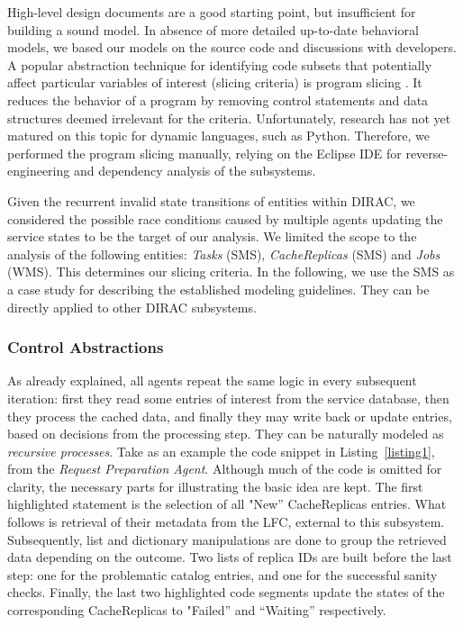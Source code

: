\documentclass[10pt,conference]{IEEEtran}
\begin{document}
High-level design documents are a good starting point, but insufficient for 
building a sound model.
In absence of more detailed up-to-date behavioral models, 
we based our models on the source code and discussions with developers.
A popular abstraction technique
for identifying code subsets that potentially affect particular 
variables of interest (slicing criteria) is program slicing \cite{Hatcliff99slicingsoftware}. 
It reduces the behavior of a program
by removing control statements and data structures deemed irrelevant for 
the criteria. Unfortunately, research has not yet
matured on this topic for dynamic languages, such as Python. 
Therefore, we performed the program slicing manually, relying on the Eclipse IDE for 
reverse-engineering and dependency analysis of the subsystems.

Given the recurrent invalid state transitions of entities within DIRAC, 
we considered the possible race conditions caused by multiple agents updating 
the service states to be the target of our analysis. We limited the scope
to the analysis of the following entities: \textit{Tasks} (SMS), \textit{CacheReplicas} (SMS) and \textit{Jobs} (WMS).
This determines our slicing criteria. In the following, we use the SMS as a case study
for describing the established modeling guidelines. They can be 
directly applied to other DIRAC subsystems.

\subsubsection{Control Abstractions}
As already explained, all agents repeat the same logic in every subsequent iteration: first they
read some entries of interest from the service database, then they process the cached data, and finally
they may write back or update entries, based on decisions from the processing step.
They can be naturally modeled as \textit{recursive processes}.
Take as an example the code snippet
in Listing~\ref{listing1}, from the \textit{Request Preparation Agent}. 
Although much of the code is omitted for clarity, the necessary parts for
illustrating the basic idea are kept.
The first highlighted statement is the selection of all "New'' CacheReplicas
entries. What follows is retrieval of their metadata from the LFC,
external to this subsystem. Subsequently, list and dictionary manipulations
are done to group the retrieved data depending on the outcome.
Two lists of replica IDs are built before the last step: one for the problematic catalog entries,
and one for the successful sanity checks.
Finally, the last two highlighted code segments update the states 
of the corresponding CacheReplicas to "Failed'' and ``Waiting'' respectively.
\end{document}
